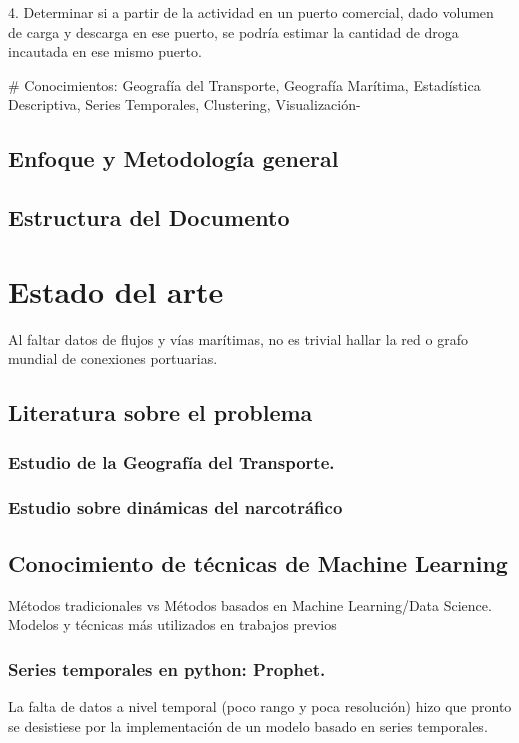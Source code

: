 \documentclass{article}
\begin{document}
	4. Determinar si a partir de la actividad en un puerto comercial, dado volumen de carga y descarga en ese puerto, se podría estimar la cantidad de droga incautada en ese mismo puerto.

	# Conocimientos: Geografía del Transporte, Geografía Marítima, Estadística Descriptiva, Series Temporales, Clustering, Visualización-

	\subsection{Enfoque y Metodología general}

	\subsection{Estructura del Documento}


\section{Estado del arte}

Al faltar datos de flujos y vías marítimas, no es trivial hallar la red o grafo mundial de conexiones portuarias.

	\subsection{Literatura sobre el problema}
	
		\subsubsection{Estudio de la Geografía del Transporte.}
		
		
		\subsubsection{Estudio sobre dinámicas del narcotráfico}


	\subsection{Conocimiento de técnicas de Machine Learning}
	Métodos tradicionales vs Métodos basados en Machine Learning/Data Science.
	Modelos y técnicas más utilizados en trabajos previos


		\subsubsection{Series temporales en python: Prophet.}
		La falta de datos a nivel temporal (poco rango y poca resolución) hizo que pronto se desistiese por la implementación de un modelo basado en series temporales.
\end{document}
